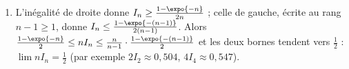 \begin{corrige}
\begin{sol}
\begin{description}
\begin{enumerate}
\begin{enumerate}
                  $2I_{n+1} \leq \frac{1 - \expo{-n}}{n} \leq 2I_n$.
            \item L'in\'egalit\'e de droite donne $I_n \geq \frac{1 - \expo{-n}}{2n}$ ; celle de gauche, \'ecrite au rang $n - 1 \geq 1$,
                  donne $I_n \leq \frac{1 - \expo{-(n-1)}}{2(n-1)}$. Alors
                  $\frac{1 - \expo{-n}}{2} \leq nI_n \leq \frac{n}{n-1}\cdot\frac{1 - \expo{-(n-1)}}{2}$ et les deux bornes tendent vers
                  $\frac{1}{2}$ : $\boxed{\lim nI_n = \frac{1}{2}}$ (par exemple $2I_2 \approx 0{,}504$, $4I_4 \approx 0{,}547$).
            \end{enumerate}
      \end{enumerate}
\end{description}
\end{sol}


\end{corrige}

